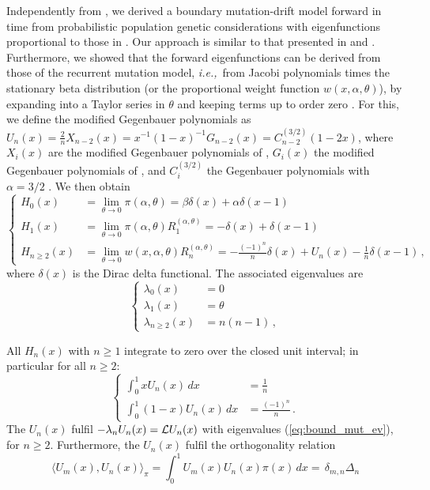 \documentclass[preprint]{elsarticle}
\newcommand\ie{{\it i.e.,}}
\begin{document}
Independently from \citet{Tran14b}, we derived a boundary mutation-drift model forward in time from probabilistic population genetic considerations \citep{Vogl15} with eigenfunctions proportional to those in \citet{Tran14b}. Our approach is similar to that presented in \citet{McKa07} and \citet{Waxm11}. Furthermore, we showed that the forward eigenfunctions can be derived from those of the recurrent mutation model, \ie\ from Jacobi polynomials times the stationary beta distribution (or the proportional weight function $w(x,\alpha,\theta)$), by expanding into a Taylor series in $\theta$ and keeping terms up to order zero \citep[][Appendix A.1]{Vogl16}. For this, we define the modified Gegenbauer polynomials as  $U_n(x)=\frac{2}{n}X_{n-2}(x)=x^{-1}(1-x)^{-1}G_{n-2}(x)=C_{n-2}^{(3/2)}(1-2x)$, where $X_i(x)$ are the modified Gegenbauer polynomials of \citet{Tran14b}, $G_i(x)$ the modified Gegenbauer polynomials of \citet{Song12}, and $C_{i}^{(3/2)}$ the Gegenbauer polynomials with $\alpha=3/2$ \citep{Abra70}. We then obtain
\begin{equation}\label{eq:forw_Us}
\begin{cases}
    H_0(x)&=\lim_{\theta\to0}\pi(\alpha,\theta)=\beta\delta(x)+\alpha\delta(x-1)\\
    H_1(x)&=\lim_{\theta\to0}\pi(\alpha,\theta)R_1^{(\alpha,\theta)}=-\delta(x)+\delta(x-1)\\
    H_{n\geq2}(x)&=\lim_{\theta\to0}w(x,\alpha,\theta)R_n^{(\alpha,\theta)}=-\frac{(-1)^n}n\delta(x)+U_n(x)-\frac{1}n\delta(x-1)\,,
\end{cases}
\end{equation}
where $\delta(x)$ is the Dirac delta functional. The associated eigenvalues are 
\begin{equation}\label{eq:bound_mut_ev}
\begin{cases}
    \lambda_0(x)&=0\\
    \lambda_1(x)&=\theta\\
    \lambda_{n\geq2}(x)&=n(n-1)\,,
\end{cases}
\end{equation}

All $H_n(x)$ with $n\geq 1$ integrate to zero over the closed unit interval; in particular for all $n\geq2$:
\begin{equation}\label{eq:int_U_n}
\begin{cases}
    \int_0^1 xU_n(x)\,dx&= \frac{1}n\\
    \int_0^1 (1-x)U_n(x)\,dx&= \frac{(-1)^n}n\,.
\end{cases} 
\end{equation}
The $U_n(x)$ fulfil $-\lambda_n U_n(x)={\cal L}U_n(x)$ with eigenvalues (\ref{eq:bound_mut_ev}), for $n\geq 2$. Furthermore, the $U_n(x)$ fulfil the orthogonality relation
\begin{equation}
    \langle U_m(x), U_n(x) \rangle_{\pi}=\int_0^1 U_m(x) U_n(x) \pi(x)\,dx=\, \delta_{m,n} \Delta_n
\end{equation} 
\end{document}
